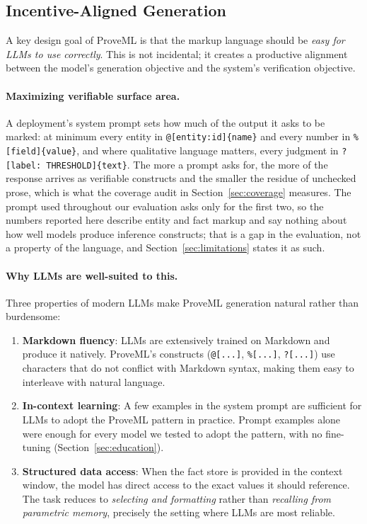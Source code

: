 \documentclass[11pt,a4paper]{article}
\begin{document}
\subsection{Incentive-Aligned Generation}

A key design goal of ProveML is that the markup language should be \textit{easy for LLMs to use correctly}. This is not incidental; it creates a productive alignment between the model's generation objective and the system's verification objective.

\paragraph{Maximizing verifiable surface area.} A deployment's system prompt sets how much of the output it asks to be marked: at minimum every entity in \texttt{@[entity:id]\{name\}} and every number in \texttt{\%[field]\{value\}}, and where qualitative language matters, every judgment in \texttt{?[label: THRESHOLD]\{text\}}. The more a prompt asks for, the more of the response arrives as verifiable constructs and the smaller the residue of unchecked prose, which is what the coverage audit in Section~\ref{sec:coverage} measures. The prompt used throughout our evaluation asks only for the first two, so the numbers reported here describe entity and fact markup and say nothing about how well models produce inference constructs; that is a gap in the evaluation, not a property of the language, and Section~\ref{sec:limitations} states it as such.

\paragraph{Why LLMs are well-suited to this.} Three properties of modern LLMs make ProveML generation natural rather than burdensome:

\begin{enumerate}
    \item \textbf{Markdown fluency}: LLMs are extensively trained on Markdown and produce it natively. ProveML's constructs (\texttt{@[...]}, \texttt{\%[...]}, \texttt{?[...]}) use characters that do not conflict with Markdown syntax, making them easy to interleave with natural language.
    \item \textbf{In-context learning}: A few examples in the system prompt are sufficient for LLMs to adopt the ProveML pattern in practice. Prompt examples alone were enough for every model we tested to adopt the pattern, with no fine-tuning (Section~\ref{sec:education}).
    \item \textbf{Structured data access}: When the fact store is provided in the context window, the model has direct access to the exact values it should reference. The task reduces to \textit{selecting and formatting} rather than \textit{recalling from parametric memory}, precisely the setting where LLMs are most reliable.
\end{enumerate}
\end{document}
